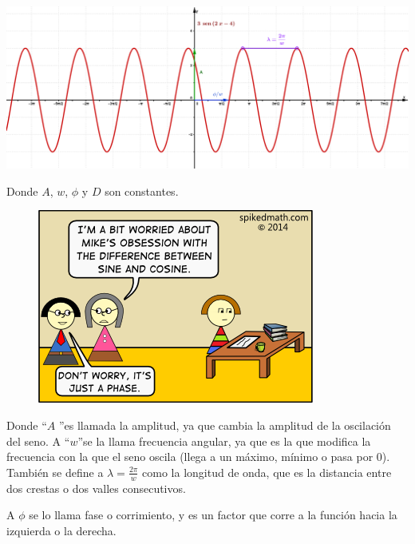\documentclass[a4paper,11pt,spanish,sans]{exam}
\begin{document}
\begin{center}
	\includegraphics[width=0.85\linewidth]{singeneral.png}
\end{center}
\begin{flushright}
Donde $A$, $w$, $\phi$ y $D$ son constantes.
\end{flushright}
\begin{figure}
	\begin{center}
		\includegraphics[width=\linewidth]{phase.png}
	\end{center}
\end{figure}
Donde \textquotedblleft $A$ \textquotedblright es llamada la amplitud, ya que cambia la amplitud de la oscilación del seno.
A \textquotedblleft $w$\textquotedblright se la llama frecuencia angular, ya que es la que modifica la frecuencia con la que el seno oscila (llega a un máximo, mínimo o pasa por $0$). También se define a $\lambda=\frac{2\pi}{w}$ como la longitud de onda, que es la distancia entre dos crestas o dos valles consecutivos.

A $\phi$ se lo llama fase o corrimiento, y es un factor que corre a la función hacia la izquierda o la derecha.
\end{document}
